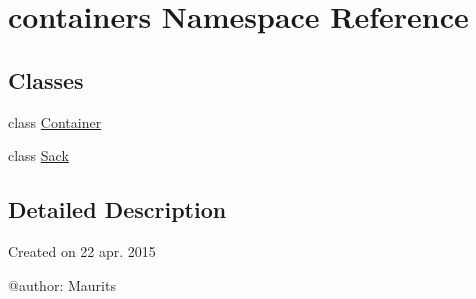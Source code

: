 \hypertarget{namespacecontainers}{}\section{containers Namespace Reference}
\label{namespacecontainers}
\subsection*{Classes}
\begin{DoxyCompactItemize}
\item 
class \hyperlink{classcontainers_1_1_container}{Container}
\item 
class \hyperlink{classcontainers_1_1_sack}{Sack}
\end{DoxyCompactItemize}


\subsection{Detailed Description}
\begin{DoxyVerb}Created on 22 apr. 2015

@author: Maurits
\end{DoxyVerb}
 